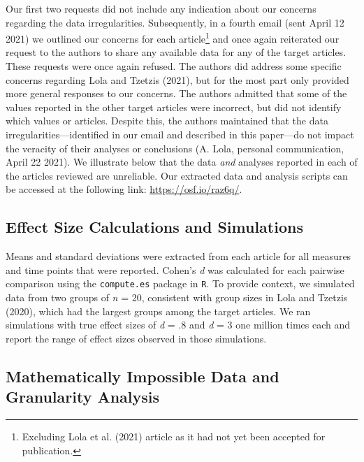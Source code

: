 \documentclass[
  english,
  man, donotrepeattitle,floatsintext]{apa7}
\begin{document}
Our first two requests did not include any indication about our concerns regarding the data irregularities. Subsequently, in a fourth email (sent April 12 2021) we outlined our concerns for each article\footnote{Excluding Lola et al. (2021) article as it had not yet been accepted for publication.} and once again reiterated our request to the authors to share any available data for any of the target articles. These requests were once again refused. The authors did address some specific concerns regarding Lola and Tzetzis (2021), but for the most part only provided more general responses to our concerns. The authors admitted that some of the values reported in the other target articles were incorrect, but did not identify which values or articles. Despite this, the authors maintained that the data irregularities---identified in our email and described in this paper---do not impact the veracity of their analyses or conclusions (A. Lola, personal communication, April 22 2021). We illustrate below that the data \emph{and} analyses reported in each of the articles reviewed are unreliable. Our extracted data and analysis scripts can be accessed at the following link: \url{https://osf.io/raz6q/}.

\hypertarget{effect-size-calculations-and-simulations}{%
\subsection{Effect Size Calculations and Simulations}\label{effect-size-calculations-and-simulations}}

Means and standard deviations were extracted from each article for all measures and time points that were reported. Cohen's \emph{d} was calculated for each pairwise comparison using the \texttt{compute.es} package in \texttt{R}. To provide context, we simulated data from two groups of \emph{n} = 20, consistent with group sizes in Lola and Tzetzis (2020), which had the largest groups among the target articles. We ran simulations with true effect sizes of \emph{d} = .8 and \emph{d} = 3 one million times each and report the range of effect sizes observed in those simulations.

\hypertarget{mathematically-impossible-data-and-granularity-analysis}{%
\subsection{Mathematically Impossible Data and Granularity Analysis}\label{mathematically-impossible-data-and-granularity-analysis}}
\end{document}
